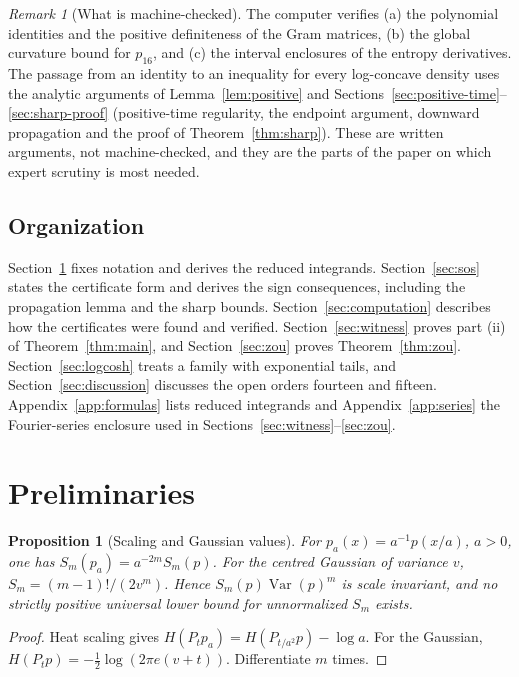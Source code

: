 \documentclass[11pt]{article}
\newtheorem{proposition}[theorem]{Proposition}
\theoremstyle{definition}
\theoremstyle{remark}
\newtheorem{remark}[theorem]{Remark}
\newcommand{\Var}{\operatorname{Var}}
\begin{document}
\begin{remark}[What is machine-checked]\label{rem:status}
The computer verifies (a) the polynomial identities and the positive definiteness of
the Gram matrices, (b) the global curvature bound for $p_{16}$, and (c) the interval
enclosures of the entropy derivatives. The passage from an identity to an inequality
for every log-concave density uses the analytic arguments of
Lemma~\ref{lem:positive} and Sections~\ref{sec:positive-time}--\ref{sec:sharp-proof}
(positive-time regularity, the endpoint argument, downward propagation and the proof
of Theorem~\ref{thm:sharp}). These are written arguments, not machine-checked, and
they are the parts of the paper on which expert scrutiny is most needed.
\end{remark}

\subsection{Organization}
Section~\ref{sec:prelim} fixes notation and derives the reduced integrands.
Section~\ref{sec:sos} states the certificate form and derives the sign consequences,
including the propagation lemma and the sharp bounds. Section~\ref{sec:computation}
describes how the certificates were found and verified. Section~\ref{sec:witness}
proves part (ii) of Theorem~\ref{thm:main}, and Section~\ref{sec:zou} proves
Theorem~\ref{thm:zou}. Section~\ref{sec:logcosh} treats a family with exponential
tails, and Section~\ref{sec:discussion} discusses the open orders fourteen and fifteen.
Appendix~\ref{app:formulas} lists reduced integrands and Appendix~\ref{app:series}
the Fourier-series enclosure used in Sections~\ref{sec:witness}--\ref{sec:zou}.

\section{Preliminaries}\label{sec:prelim}

\begin{proposition}[Scaling and Gaussian values]\label{prop:scaling}
For $p_a(x)=a^{-1}p(x/a)$, $a>0$, one has $S_m(p_a)=a^{-2m}S_m(p)$. For the centred
Gaussian of variance $v$, $S_m=(m-1)!/(2v^m)$. Hence $S_m(p)\Var(p)^m$ is scale
invariant, and no strictly positive universal lower bound for unnormalized $S_m$ exists.
\end{proposition}
\begin{proof}
Heat scaling gives $H(P_tp_a)=H(P_{t/a^2}p)-\log a$. For the Gaussian,
$H(P_tp)=-\tfrac12\log(2\pi e(v+t))$. Differentiate $m$ times.
\end{proof}
\end{document}
